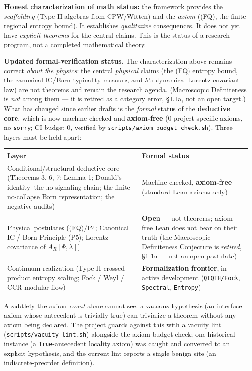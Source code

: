 \documentclass[11pt,a4paper]{article}
\begin{document}
\textbf{Honest characterization of math status:} the framework provides the \emph{scaffolding} (Type II algebras from CPW/Witten) and the \emph{axiom} ((FQ), the finite regional entropy bound). It establishes \emph{qualitative} consequences. It does not yet have \emph{explicit theorems} for the central claims. This is the status of a research program, not a completed mathematical theory.

\textbf{Updated formal-verification status.} The characterization above remains correct \emph{about the physics}: the central \emph{physical} claims (the (FQ) entropy bound, the canonical IC/Born-typicality measure, and $\lambda$'s dynamical Lorentz-covariant law) are not theorems and remain the research agenda. (Macroscopic Definiteness is \emph{not} among them — it is retired as a category error, §1.1a, not an open target.) What has changed since earlier drafts is the \emph{formal} status of the \textbf{deductive core}, which is now machine-checked and \textbf{axiom-free} (0 project-specific axioms, no \texttt{sorry}; CI budget 0, verified by \texttt{scripts/axiom\_budget\_check.sh}). Three layers must be held apart:

\begin{center}
\small
\begin{tabularx}{\linewidth}{|Y|Y|}
\hline
\textbf{Layer} & \textbf{Formal status} \\
\hline
Conditional/structural deductive core (Theorems 3, 6, 7; Lemma 1; Donald's identity; the no-signaling chain; the finite no-collapse Born representation; the negative audits) & Machine-checked, \textbf{axiom-free} (standard Lean axioms only) \\
\hline
Physical postulates ((FQ)/P4; Canonical IC / Born Principle (P5); Lorentz covariance of $A_R[\Phi,\lambda]$) & \textbf{Open} — not theorems; axiom-free Lean does not bear on their truth (the Macroscopic Definiteness Conjecture is \emph{retired}, §1.1a — not an open postulate) \\
\hline
Continuum realization (Type II crossed-product entropy scaling; Fock / Weyl / CCR modular flow) & \textbf{Formalization frontier}, in active development (\texttt{QIQTH/Fock}, \texttt{Spectral}, \texttt{Entropy}) \\
\hline
\end{tabularx}
\end{center}

A subtlety the axiom \emph{count} alone cannot see: a vacuous hypothesis (an interface axiom whose antecedent is trivially true) can trivialize a theorem without any axiom being declared. The project guards against this with a vacuity lint (\texttt{scripts/vacuity\_lint.sh}) alongside the axiom-budget check; one historical instance (a \texttt{True}-antecedent locality axiom) was caught and converted to an explicit hypothesis, and the current lint reports a single benign site (an indiscrete-preorder definition).
\end{document}
